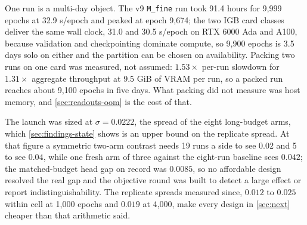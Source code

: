 One run is a multi-day object. The v9 \texttt{M\_fine} run took 91.4 hours for 9{,}999
epochs at 32.9 s/epoch and peaked at epoch 9{,}674; the two IGB card classes deliver the
same wall clock, 31.0 and 30.5 s/epoch on RTX 6000 Ada and A100, because validation and
checkpointing dominate compute, so 9{,}900 epochs is 3.5 days solo on either and the
partition can be chosen on availability. Packing two runs on one card was measured, not
assumed: $1.53\times$ per-run slowdown for $1.31\times$ aggregate throughput at 9.5 GiB of
VRAM per run, so a packed run reaches about 9{,}100 epochs in five days. What packing did
not measure was host memory, and \cref{sec:readouts-oom} is the cost of that.

The launch was sized at $\sigma = 0.0222$, the spread of the eight long-budget arms, which
\cref{sec:findings-state} shows is an upper bound on the replicate spread. At that figure
a symmetric two-arm contrast needs 19 runs a side to see $0.02$ and 5 to see $0.04$, while
one fresh arm of three against the eight-run baseline sees $0.042$; the matched-budget
head gap on record was $0.0085$, so no affordable design resolved the real gap and the
objective round was built to detect a large effect or report indistinguishability. The
replicate spreads measured since, $0.012$ to $0.025$ within cell at 1{,}000 epochs and
$0.019$ at 4{,}000, make every design in \cref{sec:next} cheaper than that arithmetic
said.
